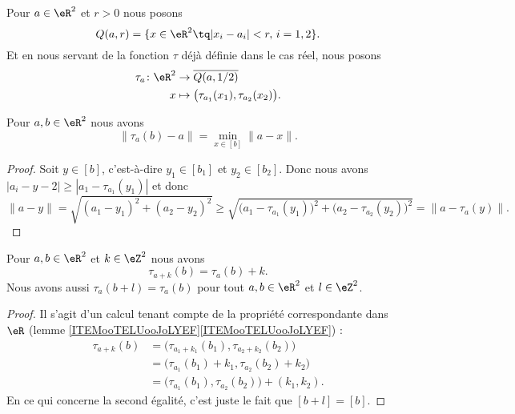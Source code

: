 Pour \( a\in \eR^2\) et \( r>0\) nous posons
\begin{equation}
	Q(a,r)=\{ x\in \eR^2\tq | x_i-a_i |<r,\,i=1,2 \}.
\end{equation}
Et en nous servant de la fonction \( \tau\) déjà définie dans le cas réel, nous posons
\begin{equation}
	\begin{aligned}
		\tau_a\colon \eR^2 & \to \overline{Q(a,1/2)}                              \\
		x                  & \mapsto \big( \tau_{a_1}(x_1),\tau_{a_2}(x_2) \big).
	\end{aligned}
\end{equation}

\begin{lemma}	\label{LEMooWYCAooYVhcoD}
	Pour \( a,b\in \eR^2\) nous avons
	\begin{equation}
		\| \tau_a(b)-a \|=\min_{x\in[b]}\| a-x \|.
	\end{equation}
\end{lemma}

\begin{proof}
	Soit \( y\in [b]\), c'est-à-dire \( y_1\in[b_1]\) et \( y_2\in [b_2]\). Donc nous avons \( | a_i-y-2 |\geq | a_1-\tau_{a_1}(y_1) |\) et donc
	\begin{equation}
		\| a-y \|=\sqrt{ (a_1-y_1)^2+(a_2-y_2)^2 }\geq \sqrt{\big( a_1-\tau_{a_1}(y_1) \big)^2+\big( a_2-\tau_{a_2}(y_2) \big)^2}=\| a-\tau_a(y) \|.
	\end{equation}
\end{proof}

\begin{lemma}	\label{LEMooTDKOooXBbqzK}
	Pour \( a,b\in \eR^2\) et \( k\in \eZ^2\) nous avons
	\begin{equation}
		\tau_{a+k}(b)=\tau_a(b)+k.
	\end{equation}
	Nous avons aussi \( \tau_a(b+l)=\tau_a(b)\) pour tout \( a,b\in \eR^2\) et \( l\in \eZ^2\).
\end{lemma}

\begin{proof}
	Il s'agit d'un calcul tenant compte de la propriété correspondante dans \( \eR\) (lemme \ref{ITEMooTELUooJoLYEF}\ref{ITEMooTELUooJoLYEF}) :
	\begin{subequations}
		\begin{align}
			\tau_{a+k}(b) & =\big( \tau_{a_1+k_1}(b_1),\tau_{a_2+k_2}(b_2) \big)    \\
			              & =\big( \tau_{a_1}(b_1)+k_1,\tau_{a_2}(b_2)+k_2 \big)    \\
			              & =\big( \tau_{a_1}(b_1),\tau_{a_2}(b_2) \big)+(k_1,k_2).
		\end{align}
	\end{subequations}
	En ce qui concerne la second égalité, c'est juste le fait que \( [b+l]=[b]\).
\end{proof}


